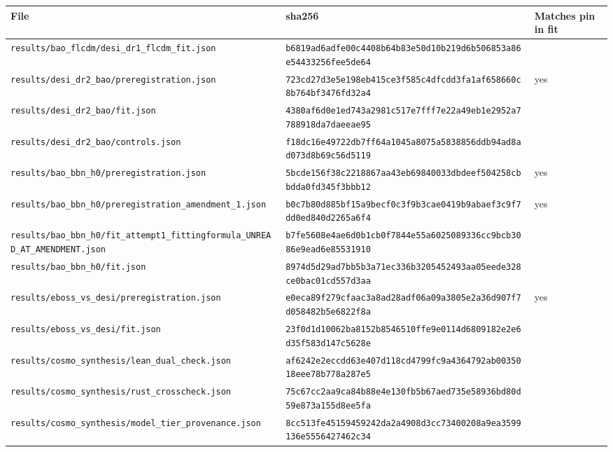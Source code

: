 \begin{tabular}{lll}
\toprule
File & sha256 & Matches pin in fit \\
\midrule
\scriptsize\texttt{results/bao\_flcdm/desi\_dr1\_flcdm\_fit.json} & \scriptsize\texttt{b6819ad6adfe00c4408b64b83e50d10b219d6b506853a86e54433256fee5de64} &  \\
\scriptsize\texttt{results/desi\_dr2\_bao/preregistration.json} & \scriptsize\texttt{723cd27d3e5e198eb415ce3f585c4dfcdd3fa1af658660c8b764bf3476fd32a4} & yes \\
\scriptsize\texttt{results/desi\_dr2\_bao/fit.json} & \scriptsize\texttt{4380af6d0e1ed743a2981c517e7fff7e22a49eb1e2952a7788918da7daeeae95} &  \\
\scriptsize\texttt{results/desi\_dr2\_bao/controls.json} & \scriptsize\texttt{f18dc16e49722db7ff64a1045a8075a5838856ddb94ad8ad073d8b69c56d5119} &  \\
\scriptsize\texttt{results/bao\_bbn\_h0/preregistration.json} & \scriptsize\texttt{5bcde156f38c2218867aa43eb69840033dbdeef504258cbbdda0fd345f3bbb12} & yes \\
\scriptsize\texttt{results/bao\_bbn\_h0/preregistration\_amendment\_1.json} & \scriptsize\texttt{b0c7b80d885bf15a9becf0c3f9b3cae0419b9abaef3c9f7dd0ed840d2265a6f4} & yes \\
\scriptsize\texttt{results/bao\_bbn\_h0/fit\_attempt1\_fittingformula\_UNREAD\_AT\_AMENDMENT.json} & \scriptsize\texttt{b7fe5608e4ae6d0b1cb0f7844e55a6025089336cc9bcb3086e9ead6e85531910} &  \\
\scriptsize\texttt{results/bao\_bbn\_h0/fit.json} & \scriptsize\texttt{8974d5d29ad7bb5b3a71ec336b3205452493aa05eede328ce0bac01cd557d3aa} &  \\
\scriptsize\texttt{results/eboss\_vs\_desi/preregistration.json} & \scriptsize\texttt{e0eca89f279cfaac3a8ad28adf06a09a3805e2a36d907f7d058482b5e6822f8a} & yes \\
\scriptsize\texttt{results/eboss\_vs\_desi/fit.json} & \scriptsize\texttt{23f0d1d10062ba8152b8546510ffe9e0114d6809182e2e6d35f583d147c5628e} &  \\
\scriptsize\texttt{results/cosmo\_synthesis/lean\_dual\_check.json} & \scriptsize\texttt{af6242e2eccdd63e407d118cd4799fc9a4364792ab0035018eee78b778a287e5} &  \\
\scriptsize\texttt{results/cosmo\_synthesis/rust\_crosscheck.json} & \scriptsize\texttt{75c67cc2aa9ca84b88e4e130fb5b67aed735e58936bd80d59e873a155d8ee5fa} &  \\
\scriptsize\texttt{results/cosmo\_synthesis/model\_tier\_provenance.json} & \scriptsize\texttt{8cc513fe45159459242da2a4908d3cc73400208a9ea3599136e5556427462c34} &  \\

\end{tabular}

